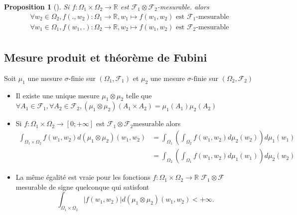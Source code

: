 \documentclass{article}
\theoremstyle{plain}%
\newtheorem{prop}[thm]{Proposition}
\theoremstyle{definition}
\theoremstyle{remark}
\begin{document}
    \begin{prop}[]
        Si $ f: \Omega _1 \times \Omega _2 \to \mathbb{R} $ est $ \mathcal{F}_1 \otimes \mathcal{F}_2 $-mesurable. alors \begin{align*}
            \forall w_2 \in \Omega _2, f(. , w_2) : \Omega_1 \to \mathbb{R}, w_1 \mapsto f(w_1, w_2) \text{ est } \mathcal{F}_1\text{-mesurable} \\
            \forall w_1 \in \Omega _1, f(w_1 , .) : \Omega_2 \to \mathbb{R}, w_2 \mapsto f(w_1, w_2) \text{ est } \mathcal{F}_2\text{-mesurable} \\
        \end{align*}
    \end{prop}
    
    \subsection{Mesure produit et théorème de Fubini}
    Soit $ \mu_1 $ une mesure $ \sigma \text{-finie} $ sur $ (\Omega _1, \mathcal{F}_1) $ et $ \mu_2 $ une mesure $ \sigma \text{-finie} $ sur $ (\Omega _2, \mathcal{F}_2)$ \begin{itemize}
        \item Il existe une unique mesure $ \mu _1 \otimes \mu _2 $ telle que $ \forall A_1 \in \mathcal{F}_1, \forall A_2 \in \mathcal{F}_2, (\mu _1 \otimes \mu _2)(A_1 \times A_2) = \mu_1 (A_1) \mu _2 (A_2) $ 
        \item Si $ f : \Omega_1 \times \Omega _2 \to [0;+\infty ]  $ est $ \mathcal{F}_1 \otimes \mathcal{F}_2 \text{mesurable} $ alors \begin{align*}
            \int_{\Omega _1 \times \Omega _2}^{}f(w_1,w_2) d (\mu _1 \otimes  \mu _2)(w_1, w_2) &= \int_{\Omega _1}^{} (\int_{\Omega _2}^{} f(w_1,w_2) d \mu _2(w_2)) d \mu _1 (w_1) \\ 
            &= \int_{\Omega _2}^{} ( \int_{\Omega _1}^{} f(w_1,w_2) d \mu _1(w_1)) d \mu _2 (w_2)
        \end{align*}
        \item La même égalité est vraie pour les fonctions $ f: \Omega _1 \times \Omega _2 \to \mathbb{R} $ $ \mathcal{F}_1 \otimes \mathcal{F}$ mesurable de signe quelconque qui satisfont 
        \[
            \int_{\Omega _1 \times \Omega _2}^{}\left| f(w_1, w_2) \right| d (\mu _1 \otimes \mu _2) (w_1, w_2) < +\infty 
        .\]
    \end{itemize}
\end{document}
